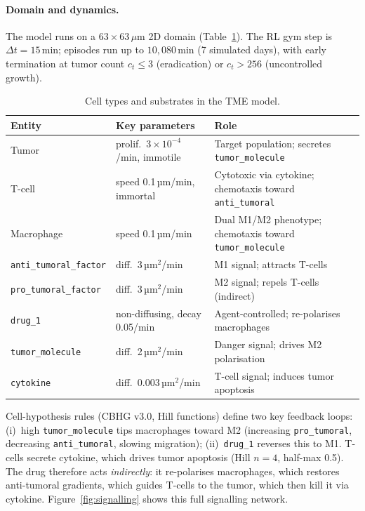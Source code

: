 \documentclass{article}
\begin{document}
\paragraph{Domain and dynamics.}
The model runs on a $63\!\times\!63\,\mu$m 2D domain (Table~\ref{tab:cells_subs}).
The RL gym step is $\Delta t = 15$\,min; episodes run up to $10{,}080$\,min
(7 simulated days), with early termination at tumor count $c_t \le 3$
(eradication) or $c_t > 256$ (uncontrolled growth).

\begin{table}[h]
  \caption{Cell types and substrates in the TME model.}
  \label{tab:cells_subs}
  \centering\small
  \begin{tabular}{llp{5.8cm}}
    \toprule
    \textbf{Entity} & \textbf{Key parameters} & \textbf{Role} \\
    \midrule
    Tumor       & prolif.\ $3\!\times\!10^{-4}$/min, immotile & Target population; secretes \texttt{tumor\_molecule} \\
    T-cell      & speed 0.1\,µm/min, immortal & Cytotoxic via cytokine; chemotaxis toward \texttt{anti\_tumoral} \\
    Macrophage  & speed 0.1\,µm/min & Dual M1/M2 phenotype; chemotaxis toward \texttt{tumor\_molecule} \\
    \midrule
    \texttt{anti\_tumoral\_factor} & diff.\ 3\,µm$^2$/min & M1 signal; attracts T-cells \\
    \texttt{pro\_tumoral\_factor}  & diff.\ 3\,µm$^2$/min & M2 signal; repels T-cells (indirect) \\
    \texttt{drug\_1}               & non-diffusing, decay 0.05/min & Agent-controlled; re-polarises macrophages \\
    \texttt{tumor\_molecule}       & diff.\ 2\,µm$^2$/min & Danger signal; drives M2 polarisation \\
    \texttt{cytokine}              & diff.\ 0.003\,µm$^2$/min & T-cell signal; induces tumor apoptosis \\
    \bottomrule
  \end{tabular}
\end{table}

Cell-hypothesis rules (CBHG v3.0, Hill functions) define two key feedback
loops: (i)~high \texttt{tumor\_molecule} tips macrophages toward M2
(increasing \texttt{pro\_tumoral}, decreasing \texttt{anti\_tumoral}, slowing
migration); (ii)~\texttt{drug\_1} reverses this to M1.
T-cells secrete cytokine, which drives tumor apoptosis (Hill $n=4$, half-max 0.5).
The drug therefore acts \emph{indirectly}: it re-polarises macrophages, which
restores anti-tumoral gradients, which guides T-cells to the tumor, which then
kill it via cytokine.
Figure~\ref{fig:signalling} shows this full signalling network.
\end{document}
